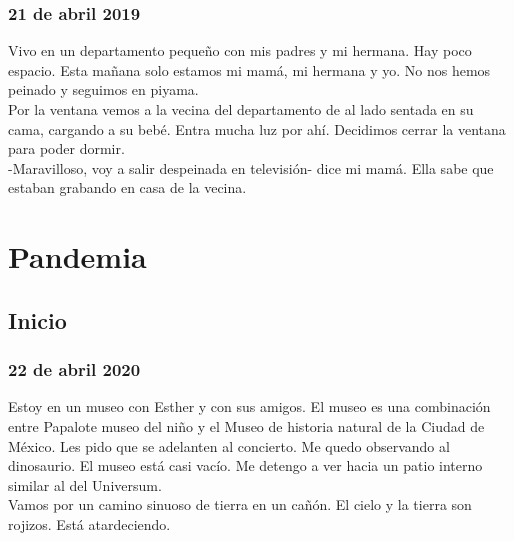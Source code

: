\documentclass[12pt]{book}
\begin{document}
\subsection*{\hfill 21 de abril 2019}

Vivo en un departamento pequeño con mis padres y mi hermana. Hay poco espacio. Esta mañana solo estamos mi mamá, mi hermana y yo. No nos hemos peinado y seguimos en piyama.
\\
Por la ventana vemos a la vecina del departamento de al lado sentada en su cama, cargando a su bebé. Entra mucha luz por ahí. Decidimos cerrar la ventana para poder dormir.
\\
-Maravilloso, voy a salir despeinada en televisión- dice mi mamá. Ella sabe que estaban grabando en casa de la vecina.


\chapter{Pandemia}

\section{Inicio}

\subsection*{\hfill 22 de abril 2020}

Estoy en un museo con Esther y con sus amigos. El museo es una combinación entre Papalote museo del niño y el Museo de historia natural de la Ciudad de México. Les pido que se adelanten al concierto. Me quedo observando al dinosaurio. El museo está casi vacío. Me detengo a ver hacia un patio interno similar al del Universum.\\
Vamos por un camino sinuoso de tierra en un cañón. El cielo y la tierra son rojizos. Está atardeciendo.
\end{document}
